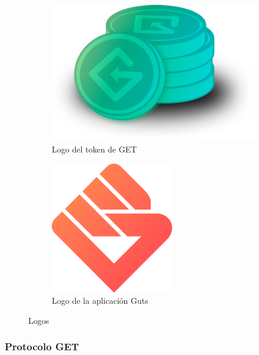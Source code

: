 \begin{figure}[hbt]
	\centering
	\begin{subfigure}[b]{0.4\linewidth}
		\centering
		\includegraphics[width=0.8\linewidth]{figs/EstadoArte/Apps/getTOKEN.png}
		\caption{Logo del token de GET}\label{fig:getTOKEN}
	\end{subfigure} 
	\begin{subfigure}[b]{0.4\linewidth}
		\centering
		\includegraphics[width=0.6\linewidth]{figs/EstadoArte/Apps/gutsLOGO.png}
		\caption{Logo de la aplicación Guts}\label{fig:gutsLOGO}
	\end{subfigure} 
	\caption[Logos de Guts y GET]{Logos}
	\label{fig:Logos}
\end{figure}

\subsubsection{Protocolo GET}


